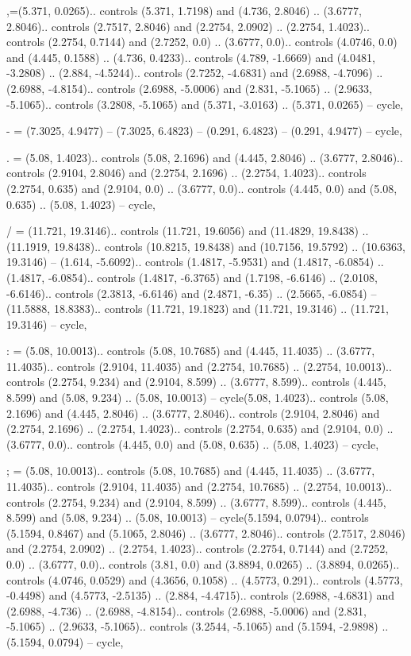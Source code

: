 {,}={(5.371, 0.0265).. controls (5.371, 1.7198) and (4.736, 2.8046) .. (3.6777, 2.8046).. controls (2.7517, 2.8046) and (2.2754, 2.0902) .. (2.2754, 1.4023).. controls (2.2754, 0.7144) and (2.7252, 0.0) .. (3.6777, 0.0).. controls (4.0746, 0.0) and (4.445, 0.1588) .. (4.736, 0.4233).. controls (4.789, -1.6669) and (4.0481, -3.2808) .. (2.884, -4.5244).. controls (2.7252, -4.6831) and (2.6988, -4.7096) .. (2.6988, -4.8154).. controls (2.6988, -5.0006) and (2.831, -5.1065) .. (2.9633, -5.1065).. controls (3.2808, -5.1065) and (5.371, -3.0163) .. (5.371, 0.0265) -- cycle},

- = {(7.3025, 4.9477) -- (7.3025, 6.4823) -- (0.291, 6.4823) -- (0.291, 4.9477) -- cycle},

. = {(5.08, 1.4023).. controls (5.08, 2.1696) and (4.445, 2.8046) .. (3.6777, 2.8046).. controls (2.9104, 2.8046) and (2.2754, 2.1696) .. (2.2754, 1.4023).. controls (2.2754, 0.635) and (2.9104, 0.0) .. (3.6777, 0.0).. controls (4.445, 0.0) and (5.08, 0.635) .. (5.08, 1.4023) -- cycle},

/ = {(11.721, 19.3146).. controls (11.721, 19.6056) and (11.4829, 19.8438) .. (11.1919, 19.8438).. controls (10.8215, 19.8438) and (10.7156, 19.5792) .. (10.6363, 19.3146) -- (1.614, -5.6092).. controls (1.4817, -5.9531) and (1.4817, -6.0854) .. (1.4817, -6.0854).. controls (1.4817, -6.3765) and (1.7198, -6.6146) .. (2.0108, -6.6146).. controls (2.3813, -6.6146) and (2.4871, -6.35) .. (2.5665, -6.0854) -- (11.5888, 18.8383).. controls (11.721, 19.1823) and (11.721, 19.3146) .. (11.721, 19.3146) -- cycle},

: = {(5.08, 10.0013).. controls (5.08, 10.7685) and (4.445, 11.4035) .. (3.6777, 11.4035).. controls (2.9104, 11.4035) and (2.2754, 10.7685) .. (2.2754, 10.0013).. controls (2.2754, 9.234) and (2.9104, 8.599) .. (3.6777, 8.599).. controls (4.445, 8.599) and (5.08, 9.234) .. (5.08, 10.0013) -- cycle(5.08, 1.4023).. controls (5.08, 2.1696) and (4.445, 2.8046) .. (3.6777, 2.8046).. controls (2.9104, 2.8046) and (2.2754, 2.1696) .. (2.2754, 1.4023).. controls (2.2754, 0.635) and (2.9104, 0.0) .. (3.6777, 0.0).. controls (4.445, 0.0) and (5.08, 0.635) .. (5.08, 1.4023) -- cycle},

; = {(5.08, 10.0013).. controls (5.08, 10.7685) and (4.445, 11.4035) .. (3.6777, 11.4035).. controls (2.9104, 11.4035) and (2.2754, 10.7685) .. (2.2754, 10.0013).. controls (2.2754, 9.234) and (2.9104, 8.599) .. (3.6777, 8.599).. controls (4.445, 8.599) and (5.08, 9.234) .. (5.08, 10.0013) -- cycle(5.1594, 0.0794).. controls (5.1594, 0.8467) and (5.1065, 2.8046) .. (3.6777, 2.8046).. controls (2.7517, 2.8046) and (2.2754, 2.0902) .. (2.2754, 1.4023).. controls (2.2754, 0.7144) and (2.7252, 0.0) .. (3.6777, 0.0).. controls (3.81, 0.0) and (3.8894, 0.0265) .. (3.8894, 0.0265).. controls (4.0746, 0.0529) and (4.3656, 0.1058) .. (4.5773, 0.291).. controls (4.5773, -0.4498) and (4.5773, -2.5135) .. (2.884, -4.4715).. controls (2.6988, -4.6831) and (2.6988, -4.736) .. (2.6988, -4.8154).. controls (2.6988, -5.0006) and (2.831, -5.1065) .. (2.9633, -5.1065).. controls (3.2544, -5.1065) and (5.1594, -2.9898) .. (5.1594, 0.0794) -- cycle},

